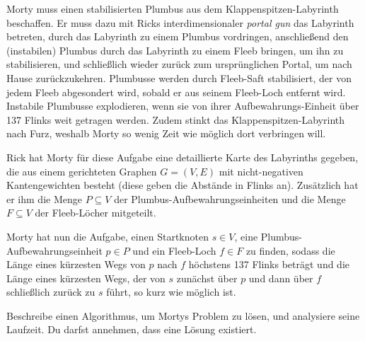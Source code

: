 \documentclass{uebung_cs}
\begin{document}
\begin{aufgabe}
    Morty muss einen stabilisierten Plumbus aus dem Klappen\-spitzen-Labyrinth beschaffen.
    Er muss dazu mit Ricks interdimensionaler \textit{portal gun} das Labyrinth betreten, durch das Labyrinth zu einem Plumbus vordringen, anschließend den (instabilen) Plumbus durch das Labyrinth zu einem Fleeb bringen, um ihn zu stabilisieren, und schließlich wieder zurück zum ursprünglichen Portal, um nach Hause zurückzukehren.
    Plumbusse werden durch Fleeb-Saft stabilisiert, der von jedem Fleeb abgesondert wird, sobald er aus seinem Fleeb-Loch entfernt wird.
    Instabile Plumbusse explodieren, wenn sie von ihrer Aufbewahrungs-Einheit über 137 Flinks weit getragen werden.
    Zudem stinkt das Klappenspitzen-Labyrinth nach Furz, weshalb Morty so wenig Zeit wie möglich dort verbringen will.

    Rick hat Morty für diese Aufgabe eine detaillierte Karte des Labyrinths gegeben, die aus einem gerichteten Graphen $G = (V,E)$ mit nicht-negativen Kantengewichten besteht (diese geben die Abstände in Flinks an).
    Zusätzlich hat er ihm die Menge $P \subseteq V$ der Plumbus-Aufbewahrungseinheiten und die Menge $F \subseteq V$ der Fleeb-Löcher mitgeteilt.
    
    Morty hat nun die Aufgabe, einen Startknoten $s \in V$, eine Plumbus-Aufbewahrungseinheit $p \in P$ und ein Fleeb-Loch $f \in F$ zu finden, sodass die Länge eines kürzesten Wegs von $p$ nach $f$ höchstens 137 Flinks beträgt und die Länge eines kürzesten Wegs, der von $s$ zunächst über $p$ und dann über $f$ schließlich zurück zu $s$ führt, so kurz wie möglich ist.

    Beschreibe einen Algorithmus, um Mortys Problem zu lösen, und analysiere seine Laufzeit.
    Du darfst annehmen, dass eine Lösung existiert.
\end{aufgabe}
\end{document}
